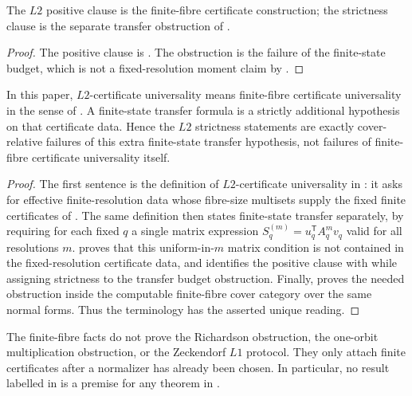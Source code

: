 \begin{corollary}\label{cor:L2-load-split}
The \(L2\) positive clause is the finite-fibre certificate construction; the
strictness clause is the separate transfer obstruction of .
\end{corollary}

\begin{proof}
The positive clause is .  The obstruction is the
failure of the finite-state budget, which is not a fixed-resolution moment
claim by
.
\end{proof}

\begin{proposition}
\label{thm:L2-terminology-bridge}
In this paper, \(L2\)-certificate universality means finite-fibre certificate
universality in the sense of .  A finite-state transfer
formula is a strictly additional hypothesis on that certificate data.  Hence the
\(L2\) strictness statements are exactly cover-relative failures of this extra
finite-state transfer hypothesis, not failures of finite-fibre certificate
universality itself.
\end{proposition}

\begin{proof}
The first sentence is the definition of \(L2\)-certificate universality in
: it asks for effective finite-resolution data whose
fibre-size multisets supply the fixed finite certificates of
.  The same definition then states
finite-state transfer separately, by requiring for each fixed \(q\) a single
matrix expression \(S_q^{(m)}=u_q^{\mathsf T}A_q^m v_q\) valid for all
resolutions \(m\).   proves that
this uniform-in-\(m\) matrix condition is not contained in the fixed-resolution
certificate data, and  identifies the positive clause
with  while assigning strictness to the transfer
budget obstruction.  Finally,
 proves the needed obstruction
inside the computable finite-fibre cover category over the same normal forms.
Thus the terminology has the asserted unique reading.
\end{proof}

\begin{corollary}
\label{cor:L2-subordinate-role}
The finite-fibre facts do not prove the Richardson obstruction, the one-orbit
multiplication obstruction, or the Zeckendorf \(L1\) protocol.  They only attach
finite certificates after a normalizer has already been chosen.  In particular,
no result labelled in  is a premise for any theorem in
.
\end{corollary}

